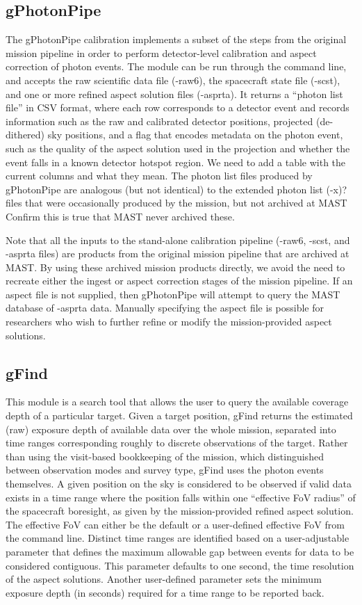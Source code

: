 \documentclass[5p]{elsarticle}
\begin{document}
\subsection{gPhotonPipe}
The gPhotonPipe calibration implements a subset of the steps from the original mission pipeline in order to perform detector-level calibration and aspect correction of photon events. The module can be run through the command line, and accepts the raw scientific data file (-raw6), the spacecraft state file (-scst), and one or more refined aspect solution files (-asprta). It returns a ``photon list file'' in CSV format, where each row corresponds to a detector event and records information such as the raw and calibrated detector positions, projected (de-dithered) sky positions, and a flag that encodes metadata on the photon event, such as the quality of the aspect solution used in the projection and whether the event falls in a known detector hotspot region.  {\color{red}We need to add a table with the current columns and what they mean.} The photon list files produced by gPhotonPipe are analogous (but not identical) to the extended photon list {\color{red}(-x)?} files that were occasionally produced by the mission, but not archived at MAST {\color{red}Confirm this is true that MAST never archived these.}

Note that all the inputs to the stand-alone calibration pipeline (-raw6, -scst, and -asprta files) are products from the original mission pipeline that are archived at MAST.  By using these archived mission products directly, we avoid the need to recreate either the ingest or aspect correction stages of the mission pipeline. If an aspect file is not supplied, then gPhotonPipe will attempt to query the MAST database of -asprta data.  Manually specifying the aspect file is possible for researchers who wish to further refine or modify the mission-provided aspect solutions.

\subsection{gFind}
This module is a search tool that allows the user to query the available coverage depth of a particular target. Given a target position, gFind returns the estimated (raw) exposure depth of available data over the whole mission, separated into time ranges corresponding roughly to discrete observations of the target. Rather than using the visit-based bookkeeping of the mission, which distinguished between observation modes and survey type, gFind uses the photon events themselves. A given position on the sky is considered to be observed if valid data exists in a time range where the position falls within one ``effective FoV radius'' of the spacecraft boresight, as given by the mission-provided refined aspect solution.  The effective FoV can either be the default or a user-defined effective FoV from the command line.  Distinct time ranges are identified based on a user-adjustable parameter that defines the maximum allowable gap between events for data to be considered contiguous.  This parameter defaults to one second, the time resolution of the aspect solutions. Another user-defined parameter sets the minimum exposure depth (in seconds) required for a time range to be reported back.
\end{document}
